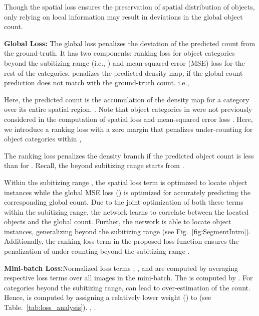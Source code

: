 \documentclass[10pt,twocolumn,letterpaper]{article}
\begin{document}
Though the spatial loss ensures the preservation of spatial distribution of objects, only relying on local information may result in deviations in the global object count. 






\noindent\textbf{Global Loss:}
The global loss penalizes the deviation of the predicted count  from the ground-truth. It has two components: ranking loss  for object categories beyond the subitizing range (i.e., ) and mean-squared error (MSE) loss  for the rest of the categories.  
 penalizes the predicted density map, if the global count prediction does not match with the ground-truth count. i.e., 
 \vspace{-0.1cm}

 Here, the predicted count  is the  accumulation of the density map for a category  over its entire spatial region. \ie 
  . 
Note that object categories in  were not previously considered in the computation of spatial loss  and mean-squared error loss . Here, we introduce a ranking loss \cite{rankingloss_cvpr2014} with a zero margin that penalizes under-counting for object categories within ,
\vspace{-0.1cm}

The ranking loss  penalizes the density branch if the predicted object count  is less than  for . Recall, the beyond subitizing range  starts from .

Within the subitizing range , the spatial loss term  is optimized to locate object instances  while the global MSE loss () is optimized for accurately predicting the corresponding global count. Due to the joint optimization of both these terms within the subitizing range, the network learns to correlate between the located objects and the global count. Further, the network is able to locate object instances, generalizing beyond the subitizing range  (see Fig.~\ref{fig:SegmentIntro}). Additionally, the ranking loss  term in the proposed loss function ensures the penalization of  under counting beyond the subitizing range .

\noindent\textbf{Mini-batch Loss:}Normalized loss terms , ,  and  are computed by averaging respective loss terms over  all  images in the mini-batch. The   is computed by .  For categories beyond the subitizing range,   can lead to over-estimation of the count. Hence,   is computed by  assigning  a relatively lower weight () to  (see Table.~\ref{tab:loss_analysis}). \ie,  .
\end{document}
